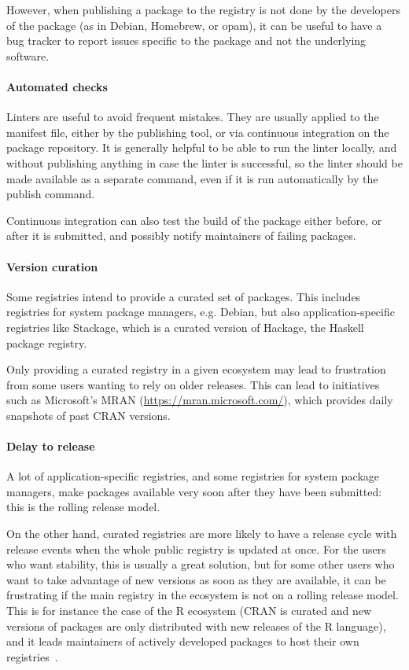 However, when publishing a package to the registry is not done by the developers of the package (as in Debian, Homebrew, or opam), it can be useful to have a bug tracker to report issues specific to the package and not the underlying software.

\paragraph{Automated checks}

Linters are useful to avoid frequent mistakes.
They are usually applied to the manifest file, either by the publishing tool, or via continuous integration on the package repository.
It is generally helpful to be able to run the linter locally, and without publishing anything in case the linter is successful, so the linter should be made available as a separate command, even if it is run automatically by the publish command.

Continuous integration can also test the build of the package either before, or after it is submitted, and possibly notify maintainers of failing packages.

\paragraph{Version curation}

Some registries intend to provide a curated set of packages.
This includes registries for system package managers, e.g. Debian, but also application-specific registries like Stackage, which is a curated version of Hackage, the Haskell package registry.

Only providing a curated registry in a given ecosystem may lead to frustration from some users wanting to rely on older releases.
This can lead to initiatives such as Microsoft's MRAN (\url{https://mran.microsoft.com/}), which provides daily snapshots of past CRAN versions.

\paragraph{Delay to release}

A lot of application-specific registries, and some registries for system package managers, make packages available very soon after they have been submitted: this is the rolling release model.

On the other hand, curated registries are more likely to have a release cycle with release events when the whole public registry is updated at once.
For the users who want stability, this is usually a great solution, but for some other users who want to take advantage of new versions as soon as they are available, it can be frustrating if the main registry in the ecosystem is not on a rolling release model.
This is for instance the case of the R ecosystem (CRAN is curated and new versions of packages are only distributed with new releases of the R language), and it leads maintainers of actively developed packages to host their own registries~\cite{boettiger2015drat}.

